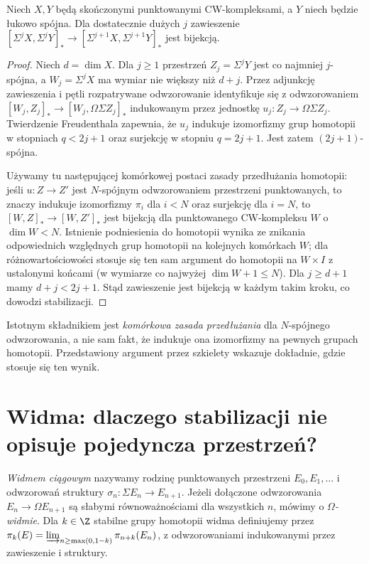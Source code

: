 \begin{stwierdzenie}
Niech $X,Y$ będą skończonymi punktowanymi
CW-kompleksami, a $Y$ niech będzie łukowo spójna.
Dla dostatecznie dużych $j$ zawieszenie
$[\Sigma^jX,\Sigma^jY]_*
\to[\Sigma^{j+1}X,\Sigma^{j+1}Y]_*$
jest bijekcją.
\end{stwierdzenie}
\begin{proof}
Niech $d=\dim X$. Dla $j\ge1$ przestrzeń
$Z_j=\Sigma^jY$ jest co najmniej $j$-spójna,
a $W_j=\Sigma^jX$ ma wymiar nie większy niż $d+j$.
Przez adjunkcję zawieszenia i pętli rozpatrywane odwzorowanie
identyfikuje się z odwzorowaniem
$[W_j,Z_j]_*\to[W_j,\Omega\Sigma Z_j]_*$
indukowanym przez jednostkę $u_j:Z_j\to\Omega\Sigma Z_j$.
Twierdzenie Freudenthala zapewnia, że $u_j$
indukuje izomorfizmy grup homotopii w stopniach
$q<2j+1$ oraz surjekcję w stopniu $q=2j+1$.
Jest zatem $(2j+1)$-spójna.

Używamy tu następującej komórkowej postaci zasady
przedłużania homotopii: jeśli $u:Z\to Z'$ jest
$N$-spójnym odwzorowaniem przestrzeni punktowanych,
to znaczy indukuje izomorfizmy $\pi_i$ dla
$i<N$ oraz surjekcję dla $i=N$, to
$[W,Z]_*\to[W,Z']_*$ jest bijekcją dla
punktowanego CW-kompleksu $W$ o $\dim W<N$.
Istnienie podniesienia do homotopii wynika ze
znikania odpowiednich względnych grup homotopii
na kolejnych komórkach $W$; dla różnowartościowości
stosuje się ten sam argument do homotopii na
$W\times I$ z ustalonymi końcami (w wymiarze
co najwyżej $\dim W+1\le N$).
Dla $j\ge d+1$ mamy $d+j<2j+1$.
Stąd zawieszenie jest bijekcją w każdym takim kroku,
co dowodzi stabilizacji.
\end{proof}
\begin{uwaga}
Istotnym składnikiem jest \emph{komórkowa zasada
przedłużania} dla $N$-spójnego odwzorowania, a nie sam fakt,
że indukuje ona izomorfizmy na pewnych grupach
homotopii. Przedstawiony argument przez szkielety
wskazuje dokładnie, gdzie stosuje się ten wynik.
\end{uwaga}

\section{Widma: dlaczego stabilizacji nie opisuje pojedyncza przestrzeń?}
\begin{definicja}
\emph{Widmem ciągowym} nazywamy rodzinę
punktowanych przestrzeni $E_0,E_1,\ldots$ i
odwzorowań struktury $\sigma_n:\Sigma E_n\to E_{n+1}$.
Jeżeli dołączone odwzorowania $E_n\to\Omega E_{n+1}$
są słabymi równoważnościami dla wszystkich $n$,
mówimy o \emph{$\Omega$-widmie}.
Dla $k\in\Z$ stabilne grupy homotopii widma
definiujemy przez
$\pi_k(E)=\varinjlim_{n\ge\max(0,1-k)}\pi_{n+k}(E_n)$,
z odwzorowaniami indukowanymi przez zawieszenie i struktury.
\end{definicja}

